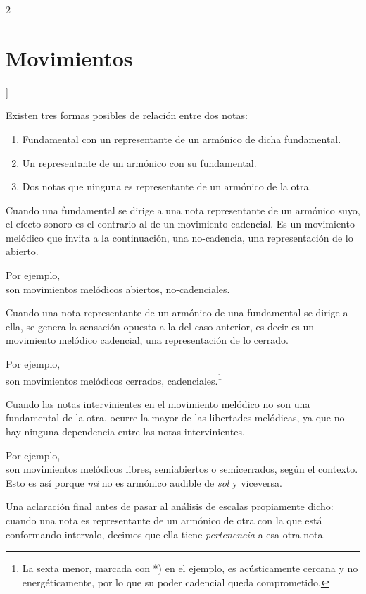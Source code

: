 \documentclass[a4paper,11pt]{article}
\begin{document}
\newpage
\begin{multicols}{2}
[\section{Movimientos}\label{sec:movimientos}]

  Existen tres formas posibles de relación entre dos notas:
  \begin{enumerate}
    \item Fundamental con un representante de un armónico de dicha fundamental.
    \item Un representante de un armónico con su fundamental.
    \item Dos notas que ninguna es representante de un armónico de la otra.
  \end{enumerate}

  Cuando una fundamental se dirige a una nota representante de un armónico suyo, el efecto sonoro es el contrario al de un movimiento cadencial. Es un movimiento melódico que invita a la continuación, una no-cadencia, una representación de lo abierto.

  Por ejemplo, \\   son movimientos melódicos abiertos, no-cadenciales.

  Cuando una nota representante de un armónico de una fundamental se dirige a ella, se genera la sensación opuesta a la del caso anterior, es decir es un movimiento melódico cadencial, una representación de lo cerrado.

  Por ejemplo, \\  son movimientos melódicos cerrados, cadenciales.\footnote{La sexta menor, marcada con *) en el ejemplo, es acústicamente cercana y no energéticamente, por lo que su poder cadencial queda comprometido.}

  Cuando las notas intervinientes en el movimiento melódico no son una fundamental de la otra, ocurre la mayor de las libertades melódicas, ya que no hay ninguna dependencia entre las notas intervinientes.

  Por ejemplo, \\   son movimientos melódicos libres, semiabiertos o semicerrados, según el contexto. Esto es así porque \emph{mi} no es armónico audible de \emph{sol} y viceversa.

  Una aclaración final antes de pasar al análisis de escalas propiamente dicho: cuando una nota es representante de un armónico de otra con la que está conformando intervalo, decimos que ella tiene \emph{pertenencia} a esa otra nota.
\end{multicols}
\end{document}
